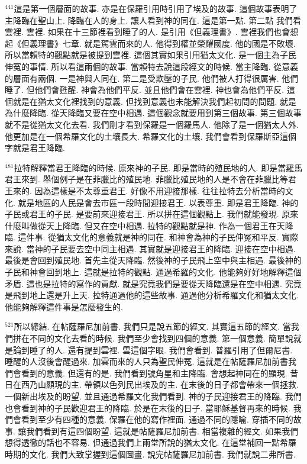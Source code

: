 \documentclass{book}
\begin{document}
$^{441}$這是第一個層面的故事.
亦是在保羅引用時引用了埃及的故事.
這個故事表明了主降臨在聖山上.
降臨在人的身上.
讓人看到神的同在.
這是第一點.
第二點 我們看雲裡.
雲裡.
如果在十三節裡看到睡了的人.
是引用《但義理書》.
雲裡我們也會想起《但義理書》七章.
就是駕雲而來的人.
他得到權並榮耀國度.
他的國是不敗壞.
所以當賴特的觀點就是被提到雲裡.
這個其實如果引用猶太文化.
是一個主為子民伸冤的事情.
所以看這兩個的故事.
當賴特去說這段經文的時候.
當主降臨.
從意義的層面有兩個.
一是神與人同在.
第二是受欺壓的子民.
他們被人打得很厲害.
他們睡了.
但他們會甦醒.
神會為他們平反.
並且他們會在雲裡.
神也會為他們平反.
這個就是在猶太文化裡找到的意義.
但找到意義也未能解決我們起初問的問題.
就是為什麼降臨.
從天降臨又要在空中相遇.
這個觀念就要用到第三個故事.
第三個故事就不是從猶太文化去看.
我們剛才看到保羅是一個羅馬人.
他除了是一個猶太人外.
他更加是在一個希羅文化的土壤長大.
希羅文化的土壤.
我們會看到保羅斯亞這個字就是君王降臨.

$^{481}$拉特解釋當君王降臨的時候.
原來神的子民.
即是當時的殖民地的人.
即是當羅馬君王來到.
舉個例子是在菲臘比的殖民地.
菲臘比殖民地的人是不會在菲臘比等君王來的.
因為這樣是不太尊重君王.
好像不用迎接那樣.
往往拉特去分析當時的文化.
就是地區的人民是會去市區一段時間迎接君王.
以表尊重.
即是君王降臨.
神的子民或君王的子民.
是要前來迎接君王.
所以拼在這個觀點上.
我們就能發現.
原來什麼叫做從天上降臨.
但又在空中相遇.
拉特的觀點就是神.
作為一個君王在天降臨.
這件事.
從猶太文化的意義就是神的同在.
和神會為神的子民伸冤和平反.
實際來說.
當神的子民要去空中同主相遇.
其實就是迎接君王的降臨.
迎接在空中相遇.
最後是會回到殖民地.
首先主從天降臨.
然後神的子民飛上空中與主相遇.
最後神的子民和神會回到地上.
這就是拉特的觀點.
通過希羅的文化.
他能夠好好地解釋這個矛盾.
這也是拉特的寫作的貢獻.
就是究竟我們是要從天降臨還是在空中相遇.
究竟是飛到地上還是升上天.
拉特通過他的這些故事.
通過他分析希羅文化和猶太文化.
他能夠解釋這件事是怎麼發生的.

$^{521}$所以總結.
在帖薩羅尼加前書.
我們只是說五節的經文.
其實這五節的經文.
當我們拼在不同的文化去看的時候.
我們至少會找到四個的意義.
第一個意義.
簡單說就是論到睡了的人.
還有提到雲裡.
雲這個字眼.
我們會看到.
普羅引用了但爾尼書.
睡醒的人沒後會醒過來.
加雲而來的人只為聖民伸冤.
這就是在帖薩羅尼加前書我們會看到的意義.
但還有的是.
我們看到號角星和主降臨.
會想起神同在的顯現.
昔日在西乃山顯現的主.
帶領以色列民出埃及的主.
在末後的日子都會帶來一個拯救.
一個新出埃及的盼望.
並且通過希羅文化我們看到.
神的子民迎接君王的降臨.
我們也會看到神的子民歡迎君王的降臨.
於是在末後的日子.
當耶穌基督再來的時候.
我們會看到至少有四種的意義.
保羅在他的寫作裡面.
通過不同的隱喻.
穿插不同的故事.
讓我們看到有這四個盼望.
這就是帖薩羅尼加前書.
相當複雜的經文.
如果我們想得透徹的話也不容易.
但通過我們上兩堂所說的猶太文化.
在這堂補回一點希羅時期的文化.
我們大致掌握到這個圖畫.
說完帖薩羅尼加前書.
我們就說二弗所書.
\end{document}
